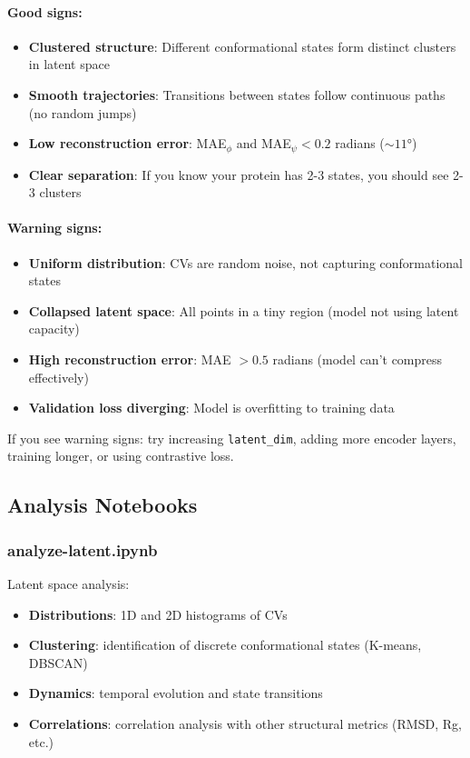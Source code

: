 \documentclass[12pt,a4paper]{article}
\begin{document}
\paragraph{Good signs:}
\begin{itemize}
    \item \textbf{Clustered structure}: Different conformational states form distinct clusters in latent space
    \item \textbf{Smooth trajectories}: Transitions between states follow continuous paths (no random jumps)
    \item \textbf{Low reconstruction error}: MAE$_\phi$ and MAE$_\psi < 0.2$ radians ($\sim 11°$)
    \item \textbf{Clear separation}: If you know your protein has 2-3 states, you should see 2-3 clusters
\end{itemize}

\paragraph{Warning signs:}
\begin{itemize}
    \item \textbf{Uniform distribution}: CVs are random noise, not capturing conformational states
    \item \textbf{Collapsed latent space}: All points in a tiny region (model not using latent capacity)
    \item \textbf{High reconstruction error}: MAE $> 0.5$ radians (model can't compress effectively)
    \item \textbf{Validation loss diverging}: Model is overfitting to training data
\end{itemize}

If you see warning signs: try increasing \texttt{latent\_dim}, adding more encoder layers, training longer, or using contrastive loss.

\subsection{Analysis Notebooks}

\subsubsection{analyze-latent.ipynb}
Latent space analysis:
\begin{itemize}
    \item \textbf{Distributions}: 1D and 2D histograms of CVs
    \item \textbf{Clustering}: identification of discrete conformational states (K-means, DBSCAN)
    \item \textbf{Dynamics}: temporal evolution and state transitions
    \item \textbf{Correlations}: correlation analysis with other structural metrics (RMSD, Rg, etc.)
\end{itemize}
\end{document}
